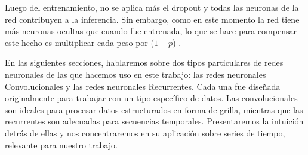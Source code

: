 \documentclass[../../main.tex]{subfiles}
\begin{document}
Luego del entrenamiento, no se aplica más el dropout y todas las neuronas de la red
contribuyen a la inferencia. Sin embargo, como en este momento la red tiene más neuronas
ocultas que cuando fue entrenada, lo que se hace para compensar este hecho es multiplicar
cada peso por (\(1-p\)) \cite{prince2024understanding}.

\bigskip
En las siguientes secciones, hablaremos sobre dos tipos particulares de redes neuronales
de las que hacemos uso en este trabajo: las redes neuronales Convolucionales y las redes
neuronales Recurrentes. Cada una fue diseñada originalmente para trabajar con un tipo
específico de datos. Las convolucionales son ideales para procesar datos estructurados en
forma de grilla, mientras que las recurrentes son adecuadas para secuencias temporales.
Presentaremos la intuición detrás de ellas y nos concentraremos en su aplicación sobre
series de tiempo, relevante para nuestro trabajo.
\end{document}
